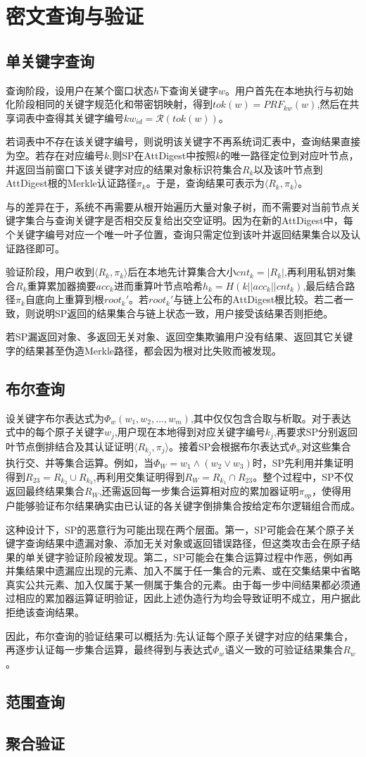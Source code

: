 \chapter{密文查询与验证}
\section{单关键字查询}
查询阶段，设用户在某个窗口状态$h$下查询关键字$w$。用户首先在本地执行与初始化阶段相同的关键字规范化和带密钥映射，得到$tok(w)=PRF_{kw}(w)$,然后在共享词表中查得其关键字编号$kw_{id}=\mathcal{R}(tok(w))$。

若词表中不存在该关键字编号，则说明该关键字不再系统词汇表中，查询结果直接为空。若存在对应编号$k$,则SP在AttDigest中按照$k$的唯一路径定位到对应叶节点，并返回当前窗口下该关键字对应的结果对象标识符集合$R_k$以及该叶节点到AttDigest根的Merkle认证路径$\pi_k$。于是，查询结果可表示为$\langle R_k,\pi_k\rangle$。

与\cite{chen2019mechanics}的差异在于，系统不再需要从根开始遍历大量对象子树，而不需要对当前节点关键字集合与查询关键字是否相交反复给出交空证明。因为在新的AttDigest中，每个关键字编号对应一个唯一叶子位置，查询只需定位到该叶并返回结果集合以及认证路径即可。

验证阶段，用户收到$\langle R_k,\pi_k\rangle$后在本地先计算集合大小$cnt_k=|R_k|$,再利用私钥对集合$R_k$重算累加器摘要$acc_k$进而重算叶节点哈希$h_k=H(k||acc_k||cnt_k)$,最后结合路径$\pi_k$自底向上重算到根$root_{k}'$。若$root_{k}'$与链上公布的AttDigest根比较。若二者一致，则说明SP返回的结果集合与链上状态一致，用户接受该结果否则拒绝。

若SP漏返回对象、多返回无关对象、返回空集欺骗用户没有结果、返回其它关键字的结果甚至伪造Merkle路径，都会因为根对比失败而被发现。
\section{布尔查询}
设关键字布尔表达式为$\Phi_{w}(w_1,w_2,\ldots,w_m)$,其中仅仅包含合取与析取。对于表达式中的每个原子关键字$w_j$,用户现在本地得到对应关键字编号$k_j$,再要求SP分别返回叶节点倒排结合及其认证证明$\langle R_{k_j},\pi_j\rangle$。接着SP会根据布尔表达式$\Phi_w$对这些集合执行交、并等集合运算。例如，当$\Phi_W=w_1\wedge(w_2 \vee w_3)$时，SP先利用并集证明得到$R_{23}=R_{k_2} \cup R_{k_3}$,再利用交集证明得到$R_W = R_{k_1} \cap R_{23}$。整个过程中，SP不仅返回最终结果集合$R_W$,还需返回每一步集合运算相对应的累加器证明$\pi_{op}$，使得用户能够验证布尔结果确实由已认证的各关键字倒排集合按给定布尔逻辑组合而成。

这种设计下，SP的恶意行为可能出现在两个层面。第一，SP可能会在某个原子关键字查询结果中遗漏对象、添加无关对象或返回错误路径，但这类攻击会在原子结果的单关键字验证阶段被发现。第二，SP可能会在集合运算过程中作恶，例如再并集结果中遗漏应出现的元素、加入不属于任一集合的元素、或在交集结果中省略真实公共元素、加入仅属于某一侧属于集合的元素。由于每一步中间结果都必须通过相应的累加器运算证明验证，因此上述伪造行为均会导致证明不成立，用户据此拒绝该查询结果。

因此，布尔查询的验证结果可以概括为:先认证每个原子关键字对应的结果集合，再逐步认证每一步集合运算，最终得到与表达式$\Phi_w$语义一致的可验证结果集合$R_w$。
\section{范围查询}
\section{聚合验证}